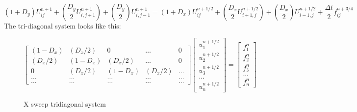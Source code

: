 \documentclass[12pt]{article}
\begin{document}
	\begin{equation}
	(1+D_y)U_{ij}^{n+1} + \left(\dfrac{D_y}{2}U_{i,j+1}^{n+1}\right) +\left(\dfrac{D_y}{2}\right)U_{i,j-1}^{n+1}  = (1+D_x)U_{ij}^{n+1/2} + \left(\dfrac{D_x}{2}U_{i+1,j}^{n+1/2}\right) +\left(\dfrac{D_x}{2}\right)U_{i-1,j}^{n+1/2} + \dfrac{\Delta t}{2}f_{ij}^{n+3/4}
	\end{equation}
	The tri-diagonal system looks like this: 

	\begin{figure}[H]

	\[
	\begin{bmatrix}
	(1-D_x) & (D_x/2) & 0 & \dots & 0 \\
	(D_x/2) & (1-D_x) & (D_x/2) & \dots & 0 \\
	0 & (D_x/2) & (1-D_x) & (D_x/2) & \dots \\
	\dots  & \dots  & \dots  & \dots & \dots  \\
	\dots & \dots & \dots & \dots & \dots 
	\end{bmatrix}
	\begin{bmatrix}
	u^{n+1/2}_1 \\ u^{n+1/2}_2 \\ u^{n+1/2}_3 \\ \dots \\ u^{n+1/2}_n 
	\end{bmatrix}
	=
	\begin{bmatrix}
	f^n_1 \\ f^n_2 \\ f^n_3 \\ \dots \\ f^n_n 
	\end{bmatrix}
	\]

	\caption{X sweep tridiagonal system}

	\end{figure}
\end{document}
